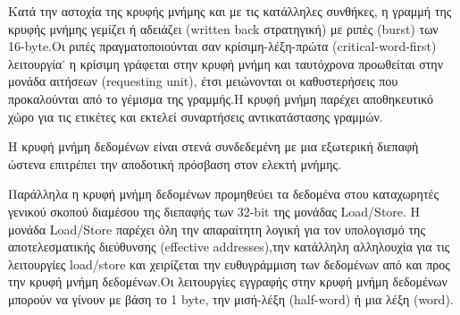 \documentclass[a4paper,10pt]{article}
\numberwithin{figure}{subsection}
\numberwithin{table}{subsection}
\begin{document}
{Κατά την αστοχία της κρυφής μνήμης και με τις κατάλληλες συνθήκες, η γραμμή της κρυφής μνήμης
γεμίζει ή αδειάζει (written back στρατηγική) με ριπές (burst) των 16-byte.Οι ριπές πραγματοποιούνται
σαν κρίσιμη-λέξη-πρώτα (critical-word-first) λειτουργία˙ η κρίσιμη γράφεται στην κρυφή μνήμη
και ταυτόχρονα προωθείται στην μονάδα αιτήσεων (requesting unit), έτσι μειώνονται οι καθυστερήσεις
που προκαλούνται από το γέμισμα της γραμμής.Η κρυφή μνήμη παρέχει αποθηκευτικό χώρο για τις
ετικέτες και εκτελεί συναρτήσεις αντικατάστασης γραμμών.
\newline

Η κρυφή μνήμη δεδομένων είναι στενά συνδεδεμένη με μια εξωτερική διεπαφή ώστενα επιτρέπει την αποδοτική
πρόσβαση στον ελεκτή μνήμης.
\newline

Παράλληλα η κρυφή μνήμη δεδομένων προμηθεύει τα δεδομένα στου καταχωρητές γενικού σκοπού διαμέσου
της διεπαφής των 32-bit της μονάδας Load/Store. Η μονάδα Load/Store παρέχει όλη την απαραίτητη λογική για
τον υπολογισμό της αποτελεσματικής διεύθυνσης (effective addresses),την κατάλληλη αλληλουχία
για τις λειτουργίες load/store και χειρίζεται την ευθυγράμμιση των δεδομένων από και 
προς την κρυφή μνήμη δεδομένων.Οι λειτουργίες εγγραφής στην κρυφή μνήμη δεδομένων μπορούν
να γίνουν με βάση το 1 byte, την μισή-λέξη (half-word) ή μια λέξη (word).

}
\end{document}
